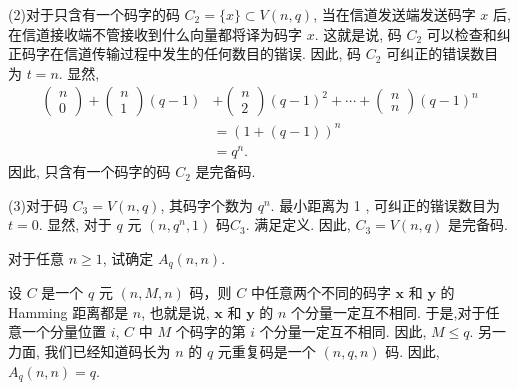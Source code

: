 \begin{tcolorbox}[breakable,colback=blue!5!white,colframe=blue!75!black,
 title= 解答题]
(2)对于只含有一个码字的码 $C_{2}=\{x\} \subset V(n, q)$, 当在信道发送端发送码字 $x$ 后, 在信道接收端不管接收到什么向量都将译为码字 $x$. 这就是说, 码 $ C_{2} $ 可以检查和纠正码字在信道传输过程中发生的任何数目的锴误. 因此, 码 $C_{2}$ 可纠正的错误数目为 $ t =n $. 显然,
$$
\begin{aligned}
\left(\begin{array}{l}
n \\
0
\end{array}\right)+\left(\begin{array}{l}
n \\
1
\end{array}\right)(q-1) & +\left(\begin{array}{l}
n \\
2
\end{array}\right)(q-1)^{2}+\cdots+\left(\begin{array}{l}
n \\
n
\end{array}\right)(q-1)^{n} \\
& =(1+(q-1))^{n} \\
& =q^{n} .
\end{aligned}
$$
因此, 只含有一个码字的码 $ C_{2} $ 是完备码.

(3)对于码 $ C_{3}=V(n, q) $, 其码字个数为 $ q^{n} $. 最小距离为 1 , 可纠正的锴误数目为 $ t=0 $. 显然, 对于 $q $ 元 $ \left(n, q^{n}, 1\right) $ 码$ C_{3} $. 满足定义. 因此, $ C_3=V(n, q) $ 是完备码.

 \end{tcolorbox}



   \begin{tcolorbox}[breakable,colback=blue!5!white,colframe=blue!75!black,
 title= 解答题]

对于任意 $ n \geq 1 $, 试确定 $ A_{q}(n, n) $.

 \tcblower


设 $ C $ 是一个 $ q $ 元 $ (n, M, n) $ 码，则 $ C $ 中任意两个不同的码字 $ \boldsymbol{x} $ 和 $ \boldsymbol{y} $ 的 Hamming 距离都是 $ n $, 也就是说, $ \boldsymbol{x} $ 和 $ \boldsymbol{y} $ 的 $ n $ 个分量一定互不相同. 于是,对于任意一个分量位置 $ i$, $C $ 中 $ M $ 个码字的第 $ i $ 个分量一定互不相同. 因此, $ M \leq q $. 另一力面, 我们已经知道码长为 $ n $ 的 $ q $ 元重复码是一个 $ (n, q, n) $ 码. 因此, $ A_{q}(n, n)=q $.
 \end{tcolorbox}




